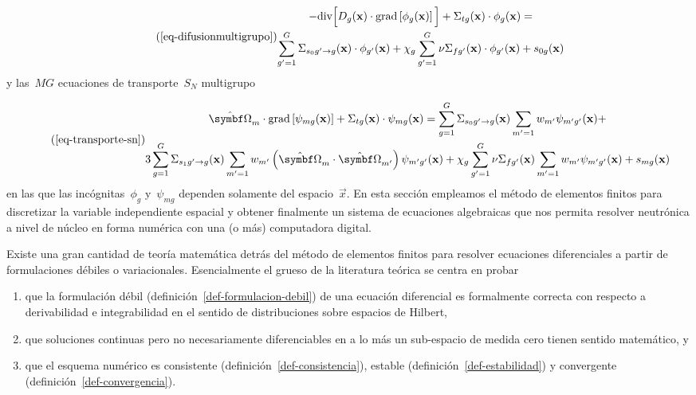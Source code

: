 \documentclass[
  12pt,
  a4paper,
  table]{scrbook}
\providecommand{\tightlist}{%
  \setlength{\itemsep}{0pt}\setlength{\parskip}{0pt}}\usepackage{longtable,booktabs,array}
\theoremstyle{plain}
\theoremstyle{definition}
\theoremstyle{plain}
\theoremstyle{plain}
\theoremstyle{remark}
\begin{document}
\[\tag{\ref{eq-difusionmultigrupo}}
\begin{gathered}
 - \text{div} \Big[ D_g(\vec{x}) \cdot \text{grad} \left[ \phi_g(\vec{x}) \right] \Big]
 + \Sigma_{t g}(\vec{x}) \cdot \phi_g(\vec{x})
 = \\
\sum_{g^\prime = 1}^G \Sigma_{s_0 g^\prime \rightarrow g}(\vec{x})  \cdot \phi_{g^\prime}(\vec{x}) +
\chi_g \sum_{g^\prime = 1}^G \nu\Sigma_{fg^\prime}(\vec{x}) \cdot \phi_{g^\prime}(\vec{x})+ s_{0g}(\vec{x})
\end{gathered}
\] y las~\(MG\) ecuaciones de transporte~\(S_N\) multigrupo

\[\tag{\ref{eq-transporte-sn}}
\begin{gathered}
 \omegaversor_m \cdot \text{grad} \left[ \psi_{mg}(\vec{x}) \right]  +
 \Sigma_{t g}(\vec{x}) \cdot \psi_{mg}(\vec{x}) =
 \sum_{g=1}^G \Sigma_{s_0 g^\prime \rightarrow g}(\vec{x})  \sum_{m^\prime=1} w_{m^\prime} \psi_{m^\prime g^\prime}(\vec{x})  + \\
 3  \sum_{g=1}^G \Sigma_{s_1 g^\prime \rightarrow g}(\vec{x}) \sum_{m^\prime=1} w_{m^\prime} \left( \omegaversor_{m} \cdot \omegaversor_{m^\prime} \right) \psi_{m^\prime g^\prime}(\vec{x}) +
 \chi_g \sum_{g^\prime=1}^G \nu\Sigma_{fg^\prime}(\vec{x})   \sum_{m^\prime=1} w_{m^\prime} \psi_{m^\prime g^\prime}(\vec{x}) +
s_{mg}(\vec{x})
\end{gathered}
\] en las que las incógnitas~\(\phi_g\) y~\(\psi_{mg}\) dependen
solamente del espacio~\(\vec{x}\). En esta sección empleamos el método
de elementos finitos para discretizar la variable independiente espacial
y obtener finalmente un sistema de ecuaciones algebraicas que nos
permita resolver neutrónica a nivel de núcleo en forma numérica con una
(o más) computadora digital.

Existe una gran cantidad de teoría matemática detrás del método de
elementos finitos para resolver ecuaciones diferenciales a partir de
formulaciones débiles o variacionales. Esencialmente el grueso de la
literatura teórica se centra en probar

\begin{enumerate}
\def\labelenumi{\arabic{enumi}.}
\tightlist
\item
  que la formulación débil (definición~\ref{def-formulacion-debil}) de
  una ecuación diferencial es formalmente correcta con respecto a
  derivabilidad e integrabilidad en el sentido de distribuciones sobre
  espacios de Hilbert,
\item
  que soluciones continuas pero no necesariamente diferenciables en a lo
  más un sub-espacio de medida cero tienen sentido matemático, y
\item
  que el esquema numérico es consistente
  (definición~\ref{def-consistencia}), estable
  (definición~\ref{def-estabilidad}) y convergente
  (definición~\ref{def-convergencia}).
\end{enumerate}
\end{document}

